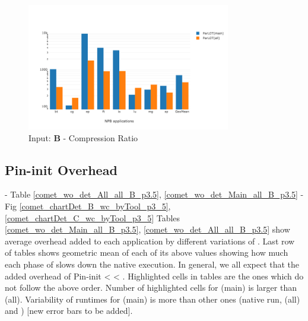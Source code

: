 \begin{figure}[!t]
\centering
\includegraphics[width=3.5in]{figs.comet/comet_chartAvg_cr_B_p3_5.png}
\caption{ Input: \textbf{B}  - Compression Ratio
}
\label{comet_chartAvg_cr_B_p3_5}
\end{figure}
  
  
\subsection{Pin-init Overhead} 
\label{subsec:pinit}
 - Table \ref{comet_wo_det_All_all_B_p3.5}, \ref{comet_wo_det_Main_all_B_p3.5}
  - Fig \ref{comet_chartDet_B_wc_byTool_p3_5}, \ref{comet_chartDet_C_wc_byTool_p3_5}
   Tables \ref{comet_wo_det_Main_all_B_p3.5}, \ref{comet_wo_det_All_all_B_p3.5} show average overhead added to each application by different variations of \parlot. Last row of tables shows geometric mean of each of its above values showing how much each phase of \parlot slows down the native execution. In general, we all expect that the added overhead of  Pin-init < \parlot < \parlotnc. Highlighted cells in tables are the ones which do not follow the above order. Number of highlighted cells for \parlot(main) is larger than \parlot(all). Variability of runtimes for \parlot(main) is more than other ones (native run, \parlot(all) and \callgrind) [new error bars to be added].
	
	





